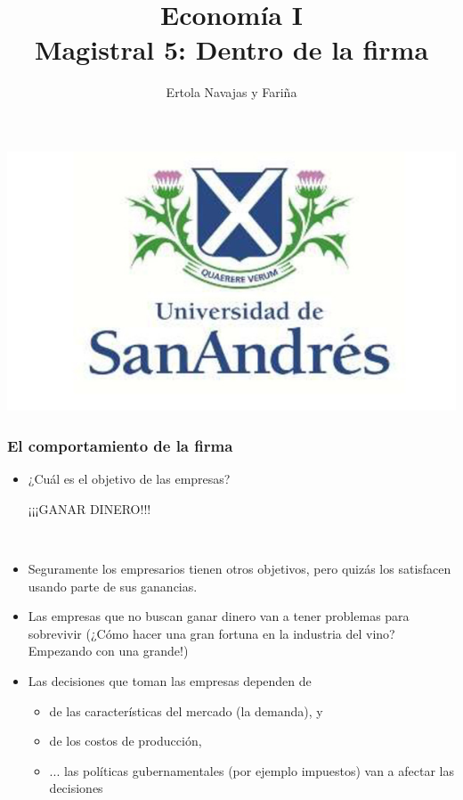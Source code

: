 \documentclass{beamer}
\title[Economía I]{Economía I \vspace{4mm}
\\ Magistral 5: Dentro de la firma}
\date{}
\author[Ertola Navajas y Fariña]{Ertola Navajas y Fariña}
\institute[]{Universidad de San Andrés}
\begin{document}
\begin{frame}
\titlepage
\centering
\includegraphics[scale=0.2]{Slides Principios de Economia/Figures/logoUDESA.jpg} 
\end{frame}

\begin{frame}
\frametitle{El comportamiento de la firma}
\begin{itemize}
    \item ¿Cuál es el objetivo de las empresas? \vspace{2mm} \\
    \begin{center}
        ¡¡¡GANAR DINERO!!!
    \end{center}  \vspace{2mm} \\
     \item Seguramente los empresarios tienen otros objetivos, pero quizás los satisfacen usando parte de sus ganancias. 
     \item Las empresas que no buscan ganar dinero van a tener problemas para sobrevivir (¿Cómo hacer una gran fortuna en la industria del vino? Empezando con una grande!) 
    \item Las decisiones que toman las empresas dependen de 
    \begin{itemize}
        \item de las características del mercado (la demanda), y \\
        \item de los costos de producción,
        \item ... las políticas gubernamentales (por ejemplo impuestos) van a afectar las decisiones
    \end{itemize}    
\end{itemize}    
\end{frame}
\end{document}
